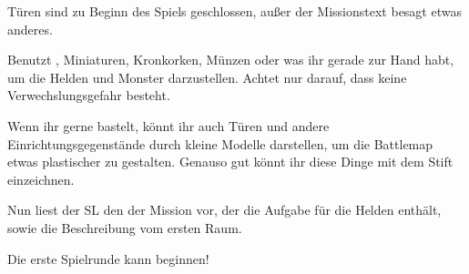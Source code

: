 {	

	\noindent
	Türen sind zu Beginn des Spiels geschlossen, außer der Missionstext besagt etwas anderes.

	\bigskip

	\noindent
	Benutzt , Miniaturen, Kronkorken, Münzen oder was ihr gerade zur Hand habt, um die Helden und Monster darzustellen. Achtet nur darauf, dass keine Verwechslungsgefahr besteht.


	\noindent
	Wenn ihr gerne bastelt, könnt ihr auch Türen und andere Einrichtungsgegenstände durch kleine Modelle darstellen, um die Battlemap etwas plastischer zu gestalten. Genauso gut könnt ihr diese Dinge mit dem Stift einzeichnen.

	\bigskip

	\noindent
	Nun liest der SL den  der Mission vor, der die Aufgabe für die Helden enthält, sowie die Beschreibung vom ersten Raum.

	\bigskip

	\noindent
	Die erste Spielrunde kann beginnen!
}

